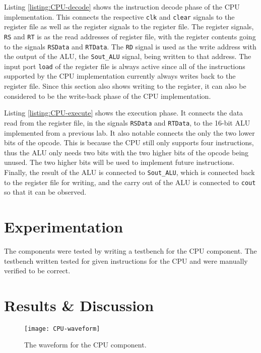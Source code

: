 \documentclass[11pt]{report}
\begin{document}
Listing \ref{listing:CPU-decode} shows the instruction decode phase of the CPU implementation. This
connects the respective \verb|clk| and \verb|clear| signals to the register file as well as the
register signals to the register file. The register signals, \verb|RS| and \verb|RT| is as the read
addresses of register file, with the register contents going to the signals \verb|RSData| and
\verb|RTData|. The \verb|RD| signal is used as the write address with the output of the ALU, the
\verb|Sout_ALU| signal, being written to that address. The input port \verb|load| of the register
file is always active since all of the instructions supported by the CPU implementation currently
always writes back to the register file. Since this section also shows writing to the register, it
can also be considered to be the write-back phase of the CPU implementation.

\newpage


Listing \ref{listing:CPU-execute} shows the execution phase. It connects the data read from the
register file, in the signals \verb|RSData| and \verb|RTData|, to the 16-bit ALU implemented from a
previous lab. It also notable connects the only the two lower bits of the opcode. This is because
the CPU still only supports four instructions, thus the ALU only needs two bits with the two higher
bits of the opcode being unused. The two higher bits will be used to implement future instructions.
Finally, the result of the ALU is connected to \verb|Sout_ALU|, which is connected back to the
register file for writing, and the carry out of the ALU is connected to \verb|cout| so that it can
be observed.

\section*{Experimentation}
The components were tested by writing a testbench for the CPU component. The testbench written
tested for given instructions for the CPU and were manually verified to be correct.

\newpage

\section*{Results \& Discussion}
\begin{figure}[h!]
    \centering
    \texttt{[image: CPU-waveform]}
    \caption{The waveform for the CPU component.}
    \label{fig:CPU-waveform}
\end{figure}
\end{document}
